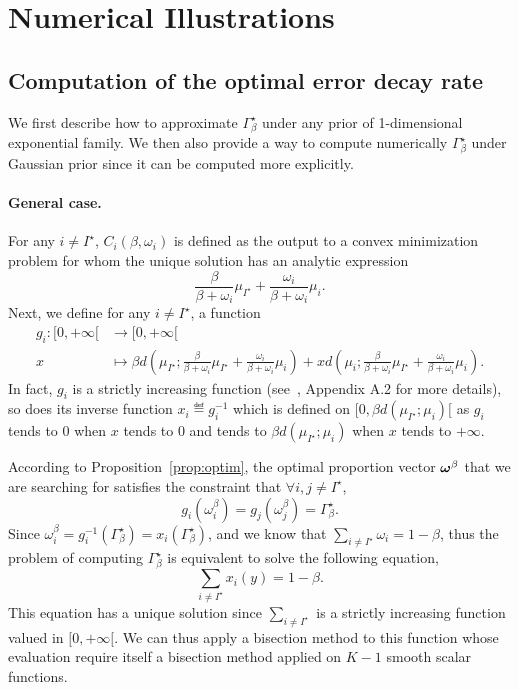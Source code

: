 \section{Numerical Illustrations}\label{sec:t3c.experiments}

\subsection{Computation of the optimal error decay rate}\label{sec:t3c.experiments.rate}

We first describe how to approximate $\Gamma_{\beta}^\star$ under any prior of 1-dimensional exponential family. We then also provide a way to compute numerically $\Gamma_{\beta}^\star$ under Gaussian prior since it can be computed more explicitly.

\paragraph{General case.}
For any $i\neq I^\star$, $C_i(\beta,\omega_i)$ is defined as the output to a convex minimization problem for whom the unique solution has an analytic expression
\[
    \frac{\beta}{\beta+\omega_i}\mu_{I^\star} + \frac{\omega_i}{\beta+\omega_i}\mu_i.
\]
Next, we define for any $i\neq I^\star$, a function
\begin{align*}
  g_i \colon [0,+\infty[ &\to [0,+\infty[\\
  x &\mapsto \beta d\left(\mu_{I^\star};\frac{\beta}{\beta+\omega_i}\mu_{I^\star} + \frac{\omega_i}{\beta+\omega_i}\mu_i\right) + x d\left(\mu_i;\frac{\beta}{\beta+\omega_i}\mu_{I^\star} + \frac{\omega_i}{\beta+\omega_i}\mu_i\right).
\end{align*}
In fact, $g_i$ is a strictly increasing function (see~\citealt{garivier2016tracknstop}, Appendix A.2 for more details), so does its inverse function $x_i \eqdef g_i^{-1}$ which is defined on $[0, \beta d(\mu_{I^\star};\mu_i)[$ as $g_i$ tends to 0 when $x$ tends to 0 and tends to $\beta d(\mu_{I^\star};\mu_i)$ when $x$ tends to $+\infty$.

According to Proposition~\ref{prop:optim}, the optimal proportion vector ${\boldsymbol \omega}^\beta$ that we are searching for satisfies the constraint that $\forall i,j\neq I^\star$,
\[
    g_i(\omega_i^\beta) = g_j(\omega_j^\beta) = \Gamma_{\beta}^\star.
\]
Since $\omega_i^\beta = g_i^{-1}(\Gamma_{\beta}^\star) = x_i(\Gamma_{\beta}^\star)$, and we know that $\sum_{i\neq I^\star} \omega_i = 1-\beta$, thus the problem of computing $\Gamma_{\beta}^\star$ is equivalent to solve the following equation,
\[
    \sum_{i\neq I^\star} x_i(y) = 1 - \beta.
\]
This equation has a unique solution since $\sum_{i\neq I^\star}$ is a strictly increasing function valued in $[0, +\infty[$. We can thus apply a bisection method to this function whose evaluation require itself a bisection method applied on $K-1$ smooth scalar functions.

